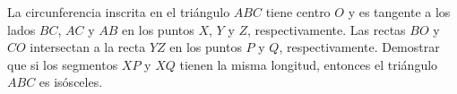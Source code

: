 La circunferencia inscrita en el triángulo $ABC$ tiene centro $O$ y es tangente a los lados $BC$, $AC$ y $AB$ en los puntos $X$, $Y$ y $Z$, respectivamente. Las rectas $BO$ y $CO$ intersectan a la recta $YZ$ en los puntos $P$ y $Q$, respectivamente. \newline 
Demostrar que si los segmentos $XP$ y $XQ$ tienen la misma longitud, entonces el triángulo $ABC$ es isósceles.

